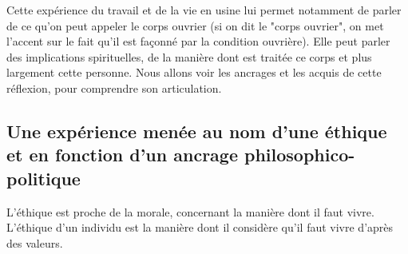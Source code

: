 \documentclass[a4paper,12pt]{book}
\begin{document}
\par Cette expérience du travail et de la vie en usine lui permet notamment de parler de ce qu'on peut appeler le corps ouvrier (si on dit le "corps ouvrier", on met l'accent sur le fait qu'il est façonné par la condition ouvrière). Elle peut parler des implications spirituelles, de la manière dont est traitée ce corps et plus largement cette personne. Nous allons voir les ancrages et les acquis de cette réflexion, pour comprendre son articulation.

\subsection{Une expérience menée au nom d'une éthique et en fonction d'un ancrage philosophico-politique}
L'éthique est proche de la morale, concernant la manière dont il faut vivre. L'éthique d'un individu est la manière dont il considère qu'il faut vivre d'après des valeurs.
\end{document}
